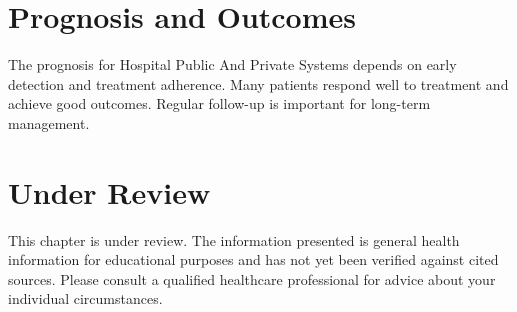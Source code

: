 \section*{Prognosis and Outcomes}
The prognosis for Hospital Public And Private Systems depends on early detection and treatment adherence. Many patients respond well to treatment and achieve good outcomes. Regular follow-up is important for long-term management.
\section*{Under Review}
This chapter is under review. The information presented is general health information for educational purposes and has not yet been verified against cited sources. Please consult a qualified healthcare professional for advice about your individual circumstances.


\clearpage
